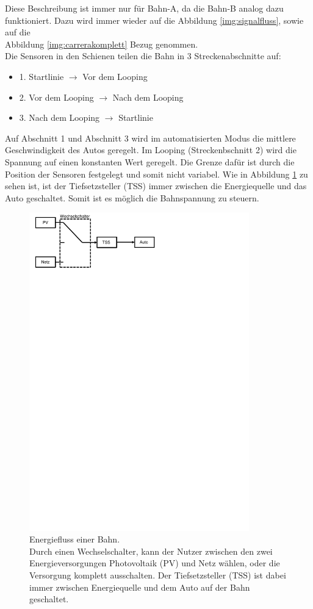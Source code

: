 \documentclass[a4paper, 11pt]{report}
\begin{document}
	Diese Beschreibung ist immer nur für Bahn-A, da die
	Bahn-B analog dazu funktioniert. Dazu wird immer wieder auf die Abbildung \ref{img:signalfluss}, sowie auf die \\Abbildung
	\ref{img:carrerakomplett} Bezug genommen.\\
	Die Sensoren in den Schienen teilen die Bahn in 3 Streckenabschnitte auf:
	\begin{itemize}
		\item{1.} Startlinie $\rightarrow$ Vor dem Looping
		\item{2.} Vor dem Looping $\rightarrow$ Nach dem Looping
		\item{3.} Nach dem Looping $\rightarrow$ Startlinie
	\end{itemize}
	Auf Abschnitt 1 und Abschnitt 3 wird im automatisierten Modus die mittlere Geschwindigkeit des Autos geregelt.
	Im Looping (Streckenbschnitt 2) wird die Spannung auf einen konstanten Wert geregelt.
	Die Grenze dafür ist durch die Position der Sensoren festgelegt und somit nicht variabel.
Wie in Abbildung \ref{img:energiefluss} zu sehen ist, ist der Tiefsetzsteller (TSS) immer zwischen die Energiequelle und das Auto geschaltet. Somit ist es möglich die Bahnspannung zu steuern. 
	\begin{figure}[ht]
		\centering
		\includegraphics[width=0.85\textwidth]{rec/energiefluss.pdf}
		\caption[Energiefluss einer Bahn]{Energiefluss einer Bahn.\\Durch einen Wechselschalter, kann der Nutzer zwischen den zwei Energieversorgungen 
			Photovoltaik (PV) und Netz wählen, oder die Versorgung komplett ausschalten. 
			Der Tiefsetzsteller (TSS) ist dabei immer zwischen Energiequelle und dem Auto auf der Bahn geschaltet.}
		\label{img:energiefluss}
	\end{figure}
\end{document}
